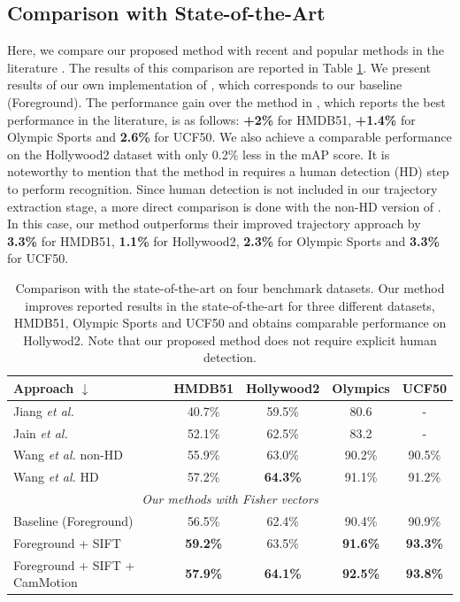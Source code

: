 \documentclass[runningheads]{llncs}
\begin{document}
\subsection{Comparison with State-of-the-Art}
Here, we compare our proposed method with recent and popular methods in the literature \cite{wang2013, jiang2012, jain2013}. The results of this comparison are reported in Table \ref{tab:stateofart}. We present results of our own implementation of \cite{wang2013}, which corresponds to our baseline (Foreground). The performance gain over the method in \cite{wang2013}, which reports the best performance in the literature, is as follows: \textbf{+2\%} for HMDB51, \textbf{+1.4\%} for Olympic Sports and \textbf{2.6\%} for UCF50. We also achieve a comparable performance on the Hollywood2 dataset with only 0.2\% less in the mAP score. It is noteworthy to mention that the method in \cite{wang2013} requires a human detection (HD) step to perform recognition. Since human detection is not included in our trajectory extraction stage, a more direct comparison is done with the non-HD version of \cite{wang2013}. In this case, our method outperforms their improved trajectory approach by \textbf{3.3\%} for HMDB51, \textbf{1.1\%} for Hollywood2, \textbf{2.3\%} for Olympic Sports and \textbf{3.3\%} for UCF50.

\begin{table}[!h]
\caption{Comparison with the state-of-the-art on four benchmark datasets. Our method improves reported results in the state-of-the-art for three different datasets, HMDB51, Olympic Sports and UCF50 and obtains comparable performance on Hollywod2. Note that our proposed method does not require explicit human detection.}
\begin{center}
{
\begin{tabular}{ |l| c c c c| }
\hline
Approach $\downarrow$ & HMDB51 & Hollywood2 & Olympics & UCF50 \\
\hline
Jiang \emph{et al.} \cite{jiang2012} & 40.7\% & 59.5\% & 80.6 & - \\
Jain \emph{et al.} \cite{jain2013} & 52.1\% & 62.5\% & 83.2 & - \\
Wang \emph{et al.} \cite{wang2013} non-HD & 55.9\% & 63.0\% & 90.2\% & 90.5\% \\
Wang \emph{et al.} \cite{wang2013} HD & 57.2\% & \textbf{64.3\%} & 91.1\% & 91.2\% \\
\hline
\multicolumn{5}{|c|}{\textit{Our methods with Fisher vectors}} \\
\hline
Baseline (Foreground) & 56.5\% & 62.4\% & 90.4\% & 90.9\% \\
Foreground + SIFT & \textbf{59.2\%} & 63.5\% & \textbf{91.6\%} & \textbf{93.3\%} \\
Foreground + SIFT + CamMotion  & \textbf{57.9\%} & \textbf{64.1\%} & \textbf{92.5\%} & \textbf{93.8\%} \\
\hline
\end{tabular}
}
\end{center}
\label{tab:stateofart}
\end{table}
\end{document}
